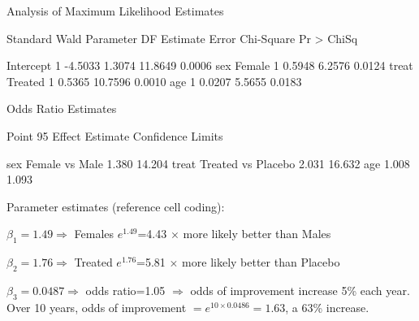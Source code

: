 \begin{frame}[fragile]
\begin{Output}[gobble=1,fontsize=\footnotesize]
             Analysis of Maximum Likelihood Estimates
 
                                  Standard        Wald
 Parameter          DF  Estimate     Error  Chi-Square  Pr > ChiSq

 Intercept           1   -4.5033    1.3074     11.8649      0.0006
 sex       Female    1        0.5948      6.2576      0.0124
 treat     Treated   1        0.5365     10.7596      0.0010
 age                 1        0.0207      5.5655      0.0183

                        Odds Ratio Estimates
                                  
                                   Point          95%
    Effect                      Estimate      Confidence Limits

    sex   Female vs Male                  1.380      14.204
    treat Treated vs Placebo              2.031      16.632
    age                                   1.008       1.093
\end{Output}
Parameter estimates (reference cell coding):
\begin{itemize*}
  \item $\beta_1 = 1.49 \Rightarrow$ Females $e^{1.49}$=4.43 $\times$ more likely better than Males
  \item $\beta_2 = 1.76 \Rightarrow$ Treated $e^{1.76}$=5.81 $\times$ more likely better than Placebo
  \item $\beta_3 = 0.0487 \Rightarrow$ odds ratio=1.05 $\Rightarrow$ odds of improvement
  increase 5\% each year.  Over 10 years, odds of improvement
  $= e^{10 \times 0.0486}= 1.63$, a 63\% increase.  
\end{itemize*}
\end{frame}

